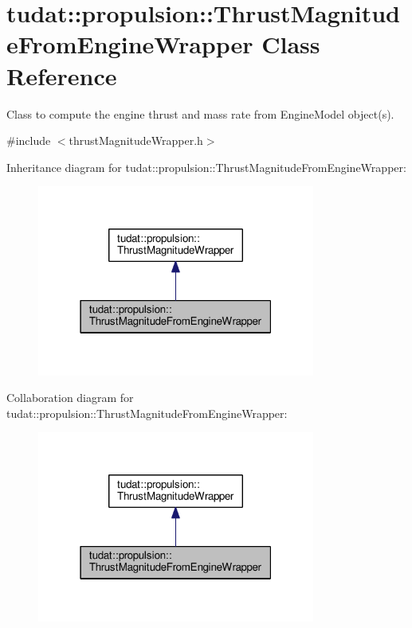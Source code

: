 \hypertarget{classtudat_1_1propulsion_1_1ThrustMagnitudeFromEngineWrapper}{}\section{tudat\+:\+:propulsion\+:\+:Thrust\+Magnitude\+From\+Engine\+Wrapper Class Reference}
\label{classtudat_1_1propulsion_1_1ThrustMagnitudeFromEngineWrapper}


Class to compute the engine thrust and mass rate from Engine\+Model object(s).  




{\ttfamily \#include $<$thrust\+Magnitude\+Wrapper.\+h$>$}



Inheritance diagram for tudat\+:\+:propulsion\+:\+:Thrust\+Magnitude\+From\+Engine\+Wrapper\+:
\nopagebreak
\begin{figure}[H]
\begin{center}
\leavevmode
\includegraphics[width=259pt]{classtudat_1_1propulsion_1_1ThrustMagnitudeFromEngineWrapper__inherit__graph}
\end{center}
\end{figure}


Collaboration diagram for tudat\+:\+:propulsion\+:\+:Thrust\+Magnitude\+From\+Engine\+Wrapper\+:
\nopagebreak
\begin{figure}[H]
\begin{center}
\leavevmode
\includegraphics[width=259pt]{classtudat_1_1propulsion_1_1ThrustMagnitudeFromEngineWrapper__coll__graph}
\end{center}
\end{figure}
